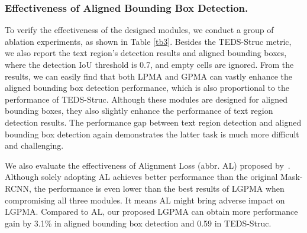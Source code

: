 \documentclass[runningheads]{llncs}
\begin{document}
\subsubsection{Effectiveness of Aligned Bounding Box Detection.}
To verify the effectiveness of the designed modules, we conduct a group of ablation experiments, as shown in Table \ref{tb3}. Besides the TEDS-Struc metric, we also report the text region's detection results and aligned bounding boxes, where the detection IoU threshold is 0.7, and empty cells are ignored. From the results, we can easily find that both LPMA and GPMA can vastly enhance the aligned bounding box detection performance, which is also proportional to the performance of TEDS-Struc. Although these modules are designed for aligned bounding boxes, they also slightly enhance the performance of text region detection results.
The performance gap between text region detection and aligned bounding box detection again demonstrates the latter task is much more difficult and challenging.

We also evaluate the effectiveness of Alignment Loss (abbr. AL)  proposed by~\cite{raja2020table}. Although solely adopting AL achieves better performance than the original Mask-RCNN, the performance is even lower than the best results of LGPMA when compromising all three modules. It means AL might bring adverse impact on LGPMA. Compared to AL, our proposed LGPMA can obtain more performance gain by 3.1\% in aligned bounding box detection and 0.59 in TEDS-Struc.
\end{document}
